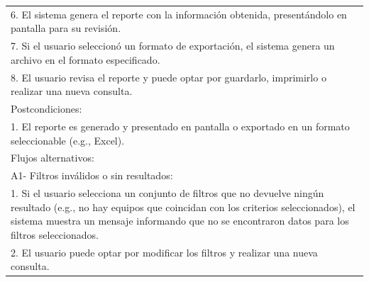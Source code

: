 \documentclass[stu, 12pt, letterpaper, donotrepeattitle, floatsintext, natbib]{apa7}
\begin{document}
\begin{longtable}{@{} p{16.5cm} @{}}
    6. El sistema genera el reporte con la informaci\'on obtenida, present\'andolo en pantalla para su revisi\'on.                                                                                                                                                               \\
    7. Si el usuario seleccion\'o un formato de exportaci\'on, el sistema genera un archivo en el formato especificado.                                                                                                                                                          \\
    8. El usuario revisa el reporte y puede optar por guardarlo, imprimirlo o realizar una nueva consulta.                                                                                                                                                                       \\ \midrule
    Postcondiciones:                                                                                                                                                                                                                                                             \\
    1. El reporte es generado y presentado en pantalla o exportado en un formato seleccionable (e.g., Excel).                                                                                                                                                                    \\ \midrule
    Flujos alternativos:                                                                                                                                                                                                                                                         \\
    A1- Filtros inv\'alidos o sin resultados:                                                                                                                                                                                                                                    \\
    \hspace{1cm}1. Si el usuario selecciona un conjunto de filtros que no devuelve ning\'un resultado (e.g., no hay equipos que coincidan con los criterios seleccionados), el sistema muestra un mensaje informando que no se encontraron datos para los filtros seleccionados. \\
    \hspace{1cm}2. El usuario puede optar por modificar los filtros y realizar una nueva consulta.                                                                                                                                                                               \\

\end{longtable}
\end{document}
